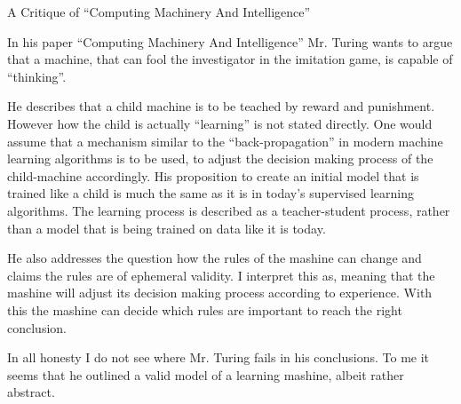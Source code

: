 \documentclass[12pt,a4paper]{article}
\author{Jonas Harlacher}
\begin{document}
{
\begin{center}
\begin{Large}
A Critique of ``Computing Machinery And Intelligence''
\end{Large}
\end{center}
In his paper ``Computing Machinery And Intelligence'' Mr. Turing wants to argue that a machine, that can fool the investigator in the imitation game, is capable of ``thinking''.

He describes that a child machine is to be teached by reward and punishment.
However how the child is actually ``learning'' is not stated directly.
One would assume that a mechanism similar to the ``back-propagation'' in modern machine learning algorithms is to be used, to adjust the decision making process of the child-machine accordingly.
His proposition to create an initial model that is trained like a child is much the same as it is in today's supervised learning algorithms.
The learning process is described as a teacher-student process, rather than a model that is being trained on data like it is today.

He also addresses the question how the rules of the mashine can change and claims the rules are of ephemeral validity.
I interpret this as, meaning that the mashine will adjust its decision making process according to experience.
With this the mashine can decide which rules are important to reach the right conclusion.


In all honesty I do not see where Mr. Turing fails in his conclusions.
To me it seems that he outlined a valid model of a learning mashine, albeit rather abstract.

}
\end{document}
